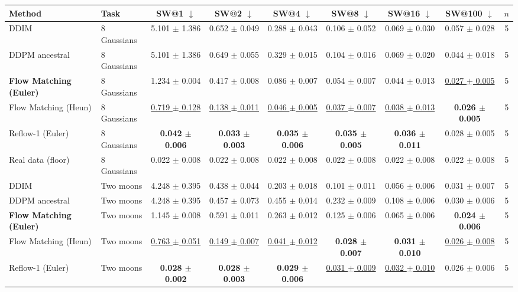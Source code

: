 \begin{tabular}{llccccccc}
\toprule
Method & Task & SW@1 $\downarrow$ & SW@2 $\downarrow$ & SW@4 $\downarrow$ & SW@8 $\downarrow$ & SW@16 $\downarrow$ & SW@100 $\downarrow$ & $n$ \\
\midrule
DDIM & 8 Gaussians & 5.101 $\pm$ 1.386 & 0.652 $\pm$ 0.049 & 0.288 $\pm$ 0.043 & 0.106 $\pm$ 0.052 & 0.069 $\pm$ 0.030 & 0.057 $\pm$ 0.028 & 5 \\
DDPM ancestral & 8 Gaussians & 5.101 $\pm$ 1.386 & 0.649 $\pm$ 0.055 & 0.329 $\pm$ 0.015 & 0.104 $\pm$ 0.016 & 0.069 $\pm$ 0.020 & 0.044 $\pm$ 0.018 & 5 \\
\textbf{Flow Matching (Euler)} & 8 Gaussians & 1.234 $\pm$ 0.004 & 0.417 $\pm$ 0.008 & 0.086 $\pm$ 0.007 & 0.054 $\pm$ 0.007 & 0.044 $\pm$ 0.013 & \underline{0.027 $\pm$ 0.005} & 5 \\
Flow Matching (Heun) & 8 Gaussians & \underline{0.719 $\pm$ 0.128} & \underline{0.138 $\pm$ 0.011} & \underline{0.046 $\pm$ 0.005} & \underline{0.037 $\pm$ 0.007} & \underline{0.038 $\pm$ 0.013} & \textbf{0.026 $\pm$ 0.005} & 5 \\
Reflow-1 (Euler) & 8 Gaussians & \textbf{0.042 $\pm$ 0.006} & \textbf{0.033 $\pm$ 0.003} & \textbf{0.035 $\pm$ 0.006} & \textbf{0.035 $\pm$ 0.005} & \textbf{0.036 $\pm$ 0.011} & 0.028 $\pm$ 0.005 & 5 \\
Real data (floor) & 8 Gaussians & 0.022 $\pm$ 0.008 & 0.022 $\pm$ 0.008 & 0.022 $\pm$ 0.008 & 0.022 $\pm$ 0.008 & 0.022 $\pm$ 0.008 & 0.022 $\pm$ 0.008 & 5 \\
\midrule
DDIM & Two moons & 4.248 $\pm$ 0.395 & 0.438 $\pm$ 0.044 & 0.203 $\pm$ 0.018 & 0.101 $\pm$ 0.011 & 0.056 $\pm$ 0.006 & 0.031 $\pm$ 0.007 & 5 \\
DDPM ancestral & Two moons & 4.248 $\pm$ 0.395 & 0.457 $\pm$ 0.073 & 0.455 $\pm$ 0.014 & 0.232 $\pm$ 0.009 & 0.108 $\pm$ 0.006 & 0.030 $\pm$ 0.006 & 5 \\
\textbf{Flow Matching (Euler)} & Two moons & 1.145 $\pm$ 0.008 & 0.591 $\pm$ 0.011 & 0.263 $\pm$ 0.012 & 0.125 $\pm$ 0.006 & 0.065 $\pm$ 0.006 & \textbf{0.024 $\pm$ 0.006} & 5 \\
Flow Matching (Heun) & Two moons & \underline{0.763 $\pm$ 0.051} & \underline{0.149 $\pm$ 0.007} & \underline{0.041 $\pm$ 0.012} & \textbf{0.028 $\pm$ 0.007} & \textbf{0.031 $\pm$ 0.010} & \underline{0.026 $\pm$ 0.008} & 5 \\
Reflow-1 (Euler) & Two moons & \textbf{0.028 $\pm$ 0.002} & \textbf{0.028 $\pm$ 0.003} & \textbf{0.029 $\pm$ 0.006} & \underline{0.031 $\pm$ 0.009} & \underline{0.032 $\pm$ 0.010} & 0.026 $\pm$ 0.006 & 5 \\

\end{tabular}
